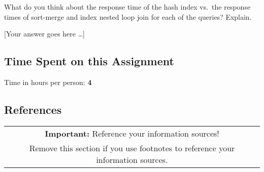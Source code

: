 \documentclass[11pt]{scrartcl}
\newcommand{\youranswerhere}{[Your answer goes here \ldots]}
\begin{document}
What do you think about the response time of the hash index vs.\ the response times of sort-merge and index nested loop join for each of the queries? Explain.

\youranswerhere{}

\subsection*{Time Spent on this Assignment}

Time in hours per person: \textbf{4}

\subsection*{References}

\begin{table}[H]
  \centering
  \begin{tabular}{c}
    \hline
    \textbf{Important:} Reference your information sources! \tabularnewline
    Remove this section if you use footnotes to reference your information
    sources. \tabularnewline
    \hline
  \end{tabular}
\end{table}
\end{document}
